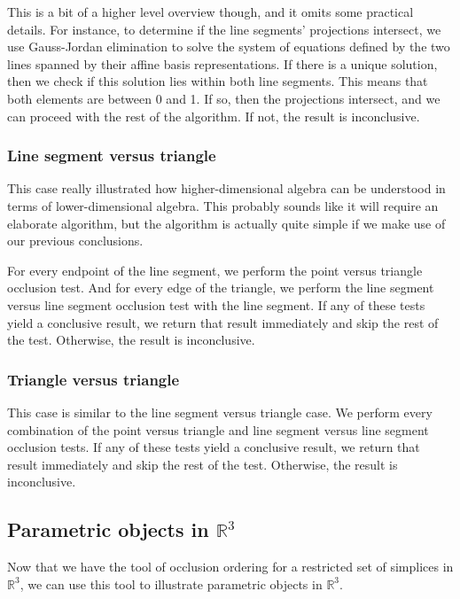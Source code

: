 This is a bit of a higher level overview though, and it omits 
some practical details. For instance, to determine if the line segments' 
projections intersect, we  use Gauss-Jordan elimination to solve the
system of equations defined by the two lines spanned by their affine 
basis representations. If there is a unique solution, then we check 
if this solution lies within both line segments. This means that both 
elements are between 0 and 1. If so, then the projections intersect,
and we can proceed with the rest of the algorithm. If not, the result
is inconclusive.

\subsubsection{Line segment versus triangle}

This case really illustrated how higher-dimensional algebra can be 
understood in terms of lower-dimensional algebra. This probably sounds 
like it will require an elaborate algorithm, but the algorithm is 
actually quite simple if we make use of our previous conclusions.

For every endpoint of the line segment, we perform the point versus 
triangle occlusion test. And for every edge of the triangle,
we perform the line segment versus line segment occlusion test with the 
line segment. If any of these tests yield a conclusive result, we
return that result immediately and skip the rest of the test. 
Otherwise, the result is inconclusive.


\subsubsection{Triangle versus triangle}

This case is similar to the line segment versus triangle case.
We perform every combination of the point versus triangle and line 
segment versus line segment occlusion tests. If any of these tests 
yield a conclusive result, we return that result immediately and skip the
rest of the test. Otherwise, the result is inconclusive.

\subsection{Parametric objects in \texorpdfstring{\(\mathbb{R}^{3}\)}{R3}}

Now that we have the tool of occlusion ordering for a restricted 
set of simplices in \(\mathbb{R}^{3}\), we can use this tool to illustrate
parametric objects in \(\mathbb{R}^{3}\). 

